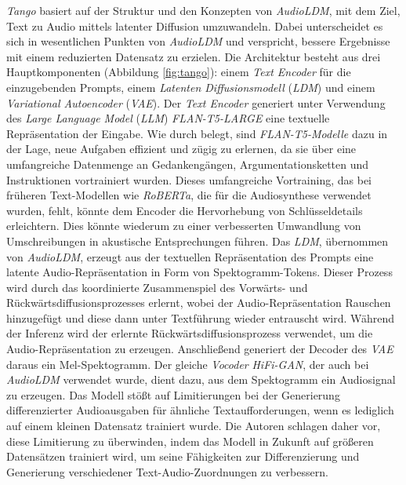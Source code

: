 \documentclass[
  a4paper,  %
  twoside,  %
  bibliography=totoc,
  headsepline,
  cleardoublepage=empty,
  parskip=half,
  draft=false
]{scrbook}
\begin{document}
\emph{Tango} \cite{ghosal_text--audio_2023} basiert auf der Struktur und den Konzepten von \emph{AudioLDM}, mit dem Ziel, Text zu Audio mittels latenter Diffusion umzuwandeln. Dabei unterscheidet es sich in wesentlichen Punkten von \emph{AudioLDM} und verspricht, bessere Ergebnisse mit einem reduzierten Datensatz zu erzielen. Die Architektur besteht aus drei Hauptkomponenten (Abbildung \ref{fig:tango}): einem \emph{Text Encoder} für die einzugebenden Prompts, einem \emph{Latenten Diffusionsmodell} (\emph{LDM})\cite{rombach_high-resolution_2022} und einem \emph{Variational Autoencoder} (\emph{VAE})\cite{kingma_auto-encoding_2022}. Der \emph{Text Encoder} generiert unter Verwendung des \emph{Large Language Model} (\emph{LLM}) \emph{FLAN-T5-LARGE} \cite{chung_scaling_2022} eine textuelle Repräsentation der Eingabe. Wie durch \cite{dai_why_2023} belegt, sind \emph{FLAN-T5-Modelle} dazu in der Lage, neue Aufgaben effizient und zügig zu erlernen, da sie über eine umfangreiche Datenmenge an Gedankengängen, Argumentationsketten und Instruktionen vortrainiert wurden. Dieses umfangreiche Vortraining, das bei früheren Text-Modellen wie \emph{RoBERTa}\cite{liu_roberta_2019}, die für die Audiosynthese verwendet wurden, fehlt, könnte dem Encoder die Hervorhebung von Schlüsseldetails erleichtern. Dies könnte wiederum zu einer verbesserten Umwandlung von Umschreibungen in akustische Entsprechungen führen. Das \emph{LDM}, übernommen von \emph{AudioLDM}, erzeugt aus der textuellen Repräsentation des Prompts eine latente Audio-Repräsentation in Form von Spektogramm-Tokens. Dieser Prozess wird durch das koordinierte Zusammenspiel des Vorwärts- und Rückwärtsdiffusionsprozesses erlernt, wobei der Audio-Repräsentation Rauschen hinzugefügt und diese dann unter Textführung wieder entrauscht wird. Während der Inferenz wird der erlernte Rückwärtsdiffusionsprozess verwendet, um die Audio-Repräsentation zu erzeugen. Anschließend generiert der Decoder des \emph{VAE} daraus ein Mel-Spektogramm. Der gleiche  \emph{Vocoder} \emph{HiFi-GAN}\cite{kong_hifi-gan_2020}, der auch bei \emph{AudioLDM} verwendet wurde, dient dazu, aus dem Spektogramm ein Audiosignal zu erzeugen. Das Modell stößt auf Limitierungen bei der Generierung differenzierter Audioausgaben für ähnliche Textaufforderungen, wenn es lediglich auf einem kleinen Datensatz trainiert wurde. Die Autoren schlagen daher vor, diese Limitierung zu überwinden, indem das Modell in Zukunft auf größeren Datensätzen trainiert wird, um seine Fähigkeiten zur Differenzierung und Generierung verschiedener Text-Audio-Zuordnungen zu verbessern.
\end{document}
